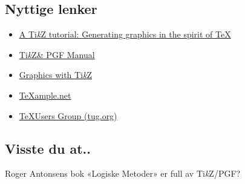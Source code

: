 \documentclass[11pt, a4paper]{article}
\newcommand{\TikZ}{Ti\textit{k}Z\xspace}
\begin{document}
\subsection{Nyttige lenker}
\begin{itemize}
	\item
	\href{http://www.tug.org/TUGboat/tb30-2/tb95mertz.pdf}{A \TikZ tutorial: Generating graphics in the spirit of \TeX}
	\item
	\href{http://www.texample.net/media/pgf/builds/pgfmanualCVS2012-11-04.pdf}{\TikZ \& PGF Manual}
	\item
	\href{https://www.tug.org/pracjourn/2007-1/mertz/mertz.pdf}{Graphics with \TikZ}
	\item
	\href{http://www.texample.net/}{TeXample.net}
	\item
	\href{http://tug.org/}{\TeX Users Group (tug.org)}
\end{itemize}


\subsection*{Visste du at..}
Roger Antonsens bok «Logiske Metoder» er full av \TikZ/PGF?
\end{document}
